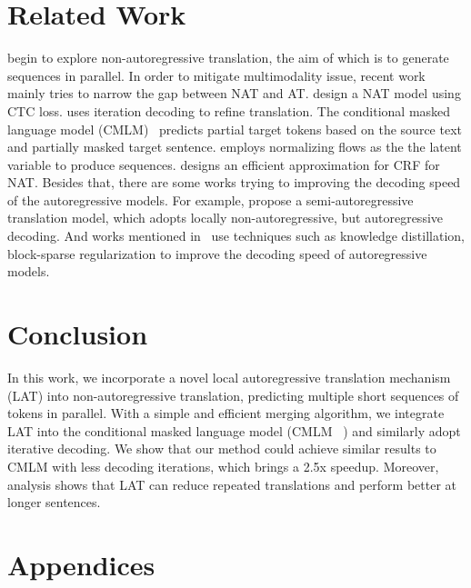 \documentclass[11pt,a4paper]{article}
\begin{document}
\section{Related Work}
 begin to explore non-autoregressive translation, the aim of which is to generate sequences in parallel. In order to mitigate multimodality issue, recent work mainly tries to narrow the gap between NAT and AT.  design a NAT model using CTC loss.  uses iteration decoding to refine translation. The conditional masked language model (CMLM)~\cite{ghazvininejad-etal-2019-mask} predicts partial target tokens based on the source text and partially masked target sentence.  employs normalizing flows as the the latent variable to produce sequences.  designs an efficient approximation for CRF for NAT.
Besides that, there are some works trying to improving the decoding speed of the autoregressive models. For example,  propose a semi-autoregressive translation model, which adopts locally non-autoregressive, but autoregressive decoding. And works mentioned in~ use techniques such as knowledge distillation, block-sparse regularization to improve the decoding speed of autoregressive models.

\section{Conclusion}

In this work, we incorporate a novel local autoregressive translation mechanism (LAT) into non-autoregressive translation, predicting multiple short sequences of tokens in parallel.
With a simple and efficient merging algorithm, we integrate LAT into the conditional masked language model (CMLM ~\citealp{ghazvininejad-etal-2019-mask}) and similarly adopt iterative decoding. We show that our method could achieve similar results to CMLM with less decoding iterations, which brings a 2.5x speedup. 
Moreover, analysis shows that LAT can reduce repeated translations and perform better at longer sentences.




\clearpage






\section*{Appendices}
\label{sec:appendix}
\end{document}
